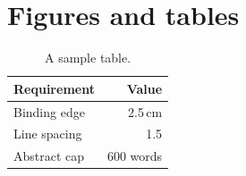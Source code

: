 \section{Figures and tables}
\begin{figure}[htbp]
  \centering
  \bangorcrest[4cm]
  \label{fig:crest}
\end{figure}

\begin{table}[htbp]
  \centering
  \caption{A sample table.}
  \label{tab:regulation}
  \begin{tabular}{lr}
    \hline
    Requirement & Value \\
    \hline
    Binding edge & 2.5\,cm \\
    Line spacing & 1.5 \\
    Abstract cap & 600 words \\
    \hline
  \end{tabular}
\end{table}
